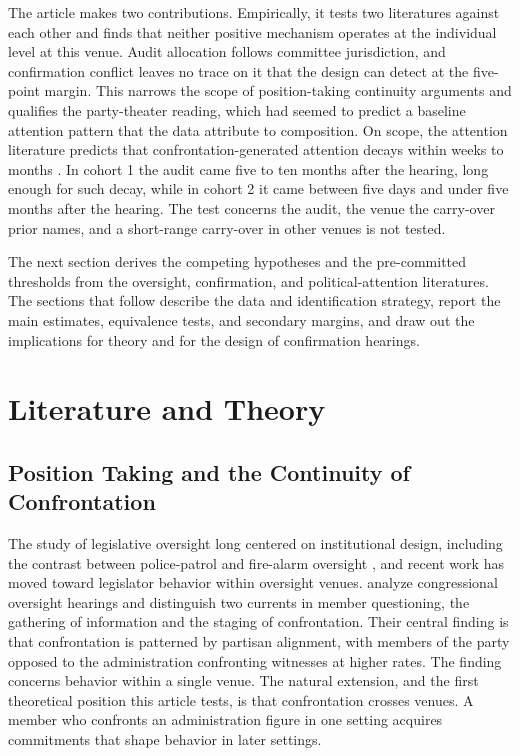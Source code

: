 \documentclass[11pt]{article}
\begin{document}
The article makes two contributions. Empirically, it tests two literatures against each other and finds that neither positive mechanism operates at the individual level at this venue. Audit allocation follows committee jurisdiction, and confirmation conflict leaves no trace on it that the design can detect at the five-point margin. This narrows the scope of position-taking continuity arguments and qualifies the party-theater reading, which had seemed to predict a baseline attention pattern that the data attribute to composition. On scope, the attention literature predicts that confrontation-generated attention decays within weeks to months \citep{birkland1998, walgrave2007, vliegenthart2016}. In cohort 1 the audit came five to ten months after the hearing, long enough for such decay, while in cohort 2 it came between five days and under five months after the hearing. The test concerns the audit, the venue the carry-over prior names, and a short-range carry-over in other venues is not tested.

The next section derives the competing hypotheses and the pre-committed thresholds from the oversight, confirmation, and political-attention literatures. The sections that follow describe the data and identification strategy, report the main estimates, equivalence tests, and secondary margins, and draw out the implications for theory and for the design of confirmation hearings.

\section{Literature and Theory}

\subsection{Position Taking and the Continuity of Confrontation}

The study of legislative oversight long centered on institutional design, including the contrast between police-patrol and fire-alarm oversight \citep{mccubbins1984}, and recent work has moved toward legislator behavior within oversight venues. \citet{eldes2023} analyze congressional oversight hearings and distinguish two currents in member questioning, the gathering of information and the staging of confrontation. Their central finding is that confrontation is patterned by partisan alignment, with members of the party opposed to the administration confronting witnesses at higher rates. The finding concerns behavior within a single venue. The natural extension, and the first theoretical position this article tests, is that confrontation crosses venues. A member who confronts an administration figure in one setting acquires commitments that shape behavior in later settings.
\end{document}
